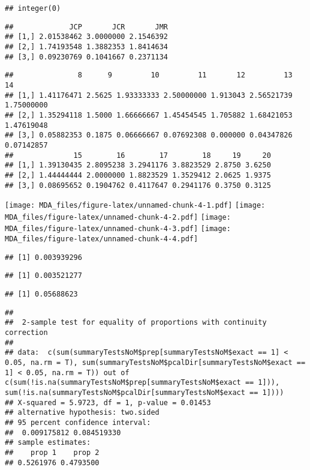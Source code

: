 \documentclass[
]{article}
\begin{document}
\begin{verbatim}
## integer(0)
\end{verbatim}

\begin{verbatim}
##             JCP       JCR       JMR
## [1,] 2.01538462 3.0000000 2.1546392
## [2,] 1.74193548 1.3882353 1.8414634
## [3,] 0.09230769 0.1041667 0.2371134
\end{verbatim}

\begin{verbatim}
##               8      9         10         11       12         13         14
## [1,] 1.41176471 2.5625 1.93333333 2.50000000 1.913043 2.56521739 1.75000000
## [2,] 1.35294118 1.5000 1.66666667 1.45454545 1.705882 1.68421053 1.47619048
## [3,] 0.05882353 0.1875 0.06666667 0.07692308 0.000000 0.04347826 0.07142857
##              15        16        17        18     19     20
## [1,] 1.39130435 2.8095238 3.2941176 3.8823529 2.8750 3.6250
## [2,] 1.44444444 2.0000000 1.8823529 1.3529412 2.0625 1.9375
## [3,] 0.08695652 0.1904762 0.4117647 0.2941176 0.3750 0.3125
\end{verbatim}

\texttt{[image: MDA\_files/figure-latex/unnamed-chunk-4-1.pdf]}
\texttt{[image: MDA\_files/figure-latex/unnamed-chunk-4-2.pdf]}
\texttt{[image: MDA\_files/figure-latex/unnamed-chunk-4-3.pdf]}
\texttt{[image: MDA\_files/figure-latex/unnamed-chunk-4-4.pdf]}

\begin{verbatim}
## [1] 0.003939296
\end{verbatim}

\begin{verbatim}
## [1] 0.003521277
\end{verbatim}

\begin{verbatim}
## [1] 0.05688623
\end{verbatim}

\begin{verbatim}
## 
##  2-sample test for equality of proportions with continuity correction
## 
## data:  c(sum(summaryTestsNoM$prep[summaryTestsNoM$exact == 1] < 0.05, na.rm = T), sum(summaryTestsNoM$pcalDir[summaryTestsNoM$exact == 1] < 0.05, na.rm = T)) out of c(sum(!is.na(summaryTestsNoM$prep[summaryTestsNoM$exact == 1])), sum(!is.na(summaryTestsNoM$pcalDir[summaryTestsNoM$exact == 1])))
## X-squared = 5.9723, df = 1, p-value = 0.01453
## alternative hypothesis: two.sided
## 95 percent confidence interval:
##  0.009175812 0.084519330
## sample estimates:
##    prop 1    prop 2 
## 0.5261976 0.4793500
\end{verbatim}
\end{document}
